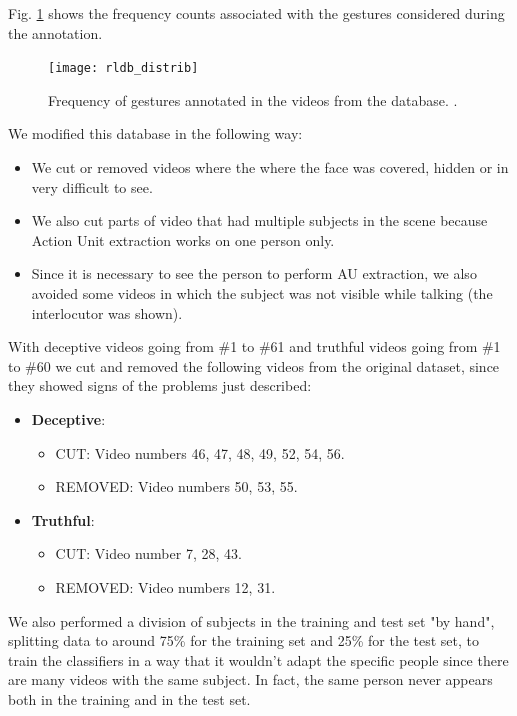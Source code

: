 Fig. \ref{fig:rldb_distrib} shows the frequency counts associated with the gestures considered during the annotation.

\begin{figure}[H]
	\centering
	\texttt{[image: rldb\_distrib]}
	\caption{Frequency of gestures annotated in the videos from the database. \cite{Perez-Rosas:2015:DDU:2818346.2820758}.}
	\label{fig:rldb_distrib}
\end{figure}


We modified this database in the following way:
\begin{itemize}
	\item We cut or removed videos where the where the face was covered, hidden or in very difficult to see.
	\item We also cut parts of video that had multiple subjects in the scene because Action Unit extraction works on one person only.
	\item Since it is necessary to see the person to perform AU extraction, we also avoided some videos in which the subject was not visible while talking (the interlocutor was shown).
\end{itemize}

With deceptive videos going from \#1 to \#61 and truthful videos going from \#1 to \#60 we cut and removed the following videos from the original dataset, since they showed signs of the problems just described:

\begin{itemize}
	\item \textbf{Deceptive}:
	\begin{itemize}
		\item CUT: Video numbers 46, 47, 48, 49, 52, 54, 56.
		\item REMOVED: Video numbers 50, 53,  55.
	\end{itemize}
	\item \textbf{Truthful}:
	\begin{itemize}
		\item CUT: Video number 7, 28, 43.
		\item REMOVED: Video numbers 12, 31. 
	\end{itemize}
\end{itemize}


We also performed a division of subjects in the training and test set "by hand", splitting data to around 75\% for the training set and 25\% for the test set, to train the classifiers in a way that it wouldn't adapt the specific people since there are many videos with the same subject. In fact, the same person never appears both in the training and in the test set.

